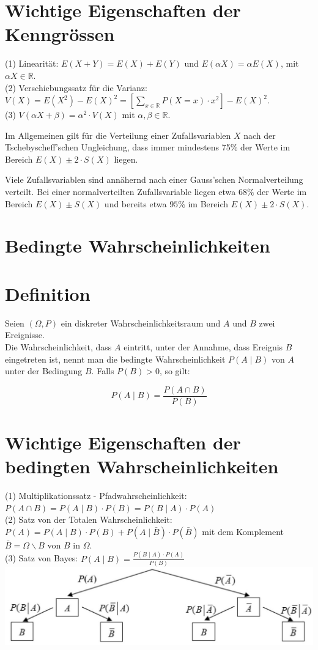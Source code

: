 \documentclass[10pt]{article}
\begin{document}
\section*{Wichtige Eigenschaften der Kenngrössen}
(1) Linearität: $E(X+Y)=E(X)+E(Y)$ und $E(\alpha X)=\alpha E(X)$, mit $\alpha X \in \mathbb{R}$.\\
(2) Verschiebungssatz für die Varianz: $V(X)=E\left(X^{2}\right)-E(X)^{2}=\left[\sum_{x \in \mathbb{R}} P(X=x) \cdot x^{2}\right]-E(X)^{2}$.\\
(3) $V(\alpha X+\beta)=\alpha^{2} \cdot V(X)$ mit $\alpha, \beta \in \mathbb{R}$.

Im Allgemeinen gilt für die Verteilung einer Zufallsvariablen $X$ nach der Tschebyscheff'schen Ungleichung, dass immer mindestens 75\% der Werte im Bereich $E(X) \pm 2 \cdot S(X)$ liegen.

Viele Zufallsvariablen sind annähernd nach einer Gauss'schen Normalverteilung verteilt. Bei einer normalverteilten Zufallsvariable liegen etwa $68 \%$ der Werte im Bereich $E(X) \pm S(X)$ und bereits etwa $95 \%$ im Bereich $E(X) \pm 2 \cdot S(X)$.

\section*{Bedingte Wahrscheinlichkeiten}
\section*{Definition}
Seien $(\Omega, P)$ ein diskreter Wahrscheinlichkeitsraum und $A$ und $B$ zwei Ereignisse.\\
Die Wahrscheinlichkeit, dass $A$ eintritt, unter der Annahme, dass Ereignis $B$ eingetreten ist, nennt man die bedingte Wahrscheinlichkeit $P(A \mid B)$ von $A$ unter der Bedingung $B$. Falls $P(B)>0$, so gilt:

$$
P(A \mid B)=\frac{P(A \cap B)}{P(B)}
$$

\section*{Wichtige Eigenschaften der bedingten Wahrscheinlichkeiten}
(1) Multiplikationssatz - Pfadwahrscheinlichkeit: $P(A \cap B)=P(A \mid B) \cdot P(B)=P(B \mid A) \cdot P(A)$\\
(2) Satz von der Totalen Wahrscheinlichkeit: $P(A)=P(A \mid B) \cdot P(B)+P(A \mid \bar{B}) \cdot P(\bar{B})$ mit dem Komplement $\bar{B}=\Omega \backslash B$ von $B$ in $\Omega$.\\
(3) Satz von Bayes: $P(A \mid B)=\frac{P(B \mid A) \cdot P(A)}{P(B)}$\\
\includegraphics[width=\linewidth]{images/2025_01_02_562c5bc6077c0879a9a9g-2}
\end{document}
